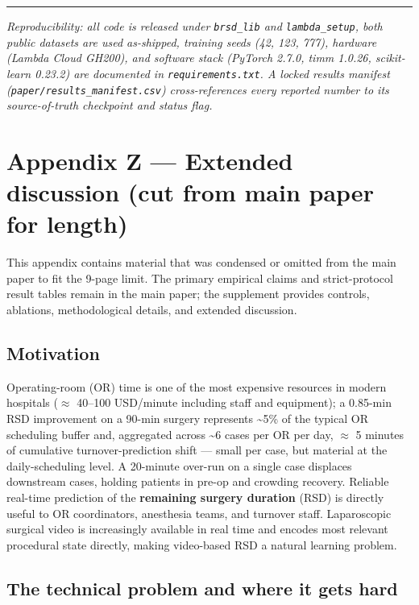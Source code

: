 \begin{center}\rule{0.5\linewidth}{0.5pt}\end{center}

\emph{Reproducibility: all code is released under \texttt{brsd\_lib} and
\texttt{lambda\_setup}, both public datasets are used as-shipped,
training seeds (42, 123, 777), hardware (Lambda Cloud GH200), and
software stack (PyTorch 2.7.0, timm 1.0.26, scikit-learn 0.23.2) are
documented in \texttt{requirements.txt}. A locked results manifest
(\texttt{paper/results\_manifest.csv}) cross-references every reported
number to its source-of-truth checkpoint and status flag.}

\section{Appendix Z --- Extended discussion (cut from main paper for length)}\label{appendix-z-extended-discussion-cut-from-main-paper-for-length}

This appendix contains material that was condensed or omitted from the
main paper to fit the 9-page limit. The primary empirical claims and
strict-protocol result tables remain in the main paper; the supplement
provides controls, ablations, methodological details, and extended
discussion.

\subsection{Motivation}\label{motivation}

Operating-room (OR) time is one of the most expensive resources in
modern hospitals ($\approx$ 40--100 USD/minute including staff and equipment); a
0.85-min RSD improvement on a 90-min surgery represents
\textasciitilde5\% of the typical OR scheduling buffer and, aggregated
across \textasciitilde6 cases per OR per day, $\approx$ 5 minutes of cumulative
turnover-prediction shift --- small per case, but material at the
daily-scheduling level. A 20-minute over-run on a single case displaces
downstream cases, holding patients in pre-op and crowding recovery.
Reliable real-time prediction of the \textbf{remaining surgery duration}
(RSD) is directly useful to OR coordinators, anesthesia teams, and
turnover staff. Laparoscopic surgical video is increasingly available in
real time and encodes most relevant procedural state directly, making
video-based RSD a natural learning problem.

\subsection{The technical problem and where it gets
hard}\label{the-technical-problem-and-where-it-gets-hard}

